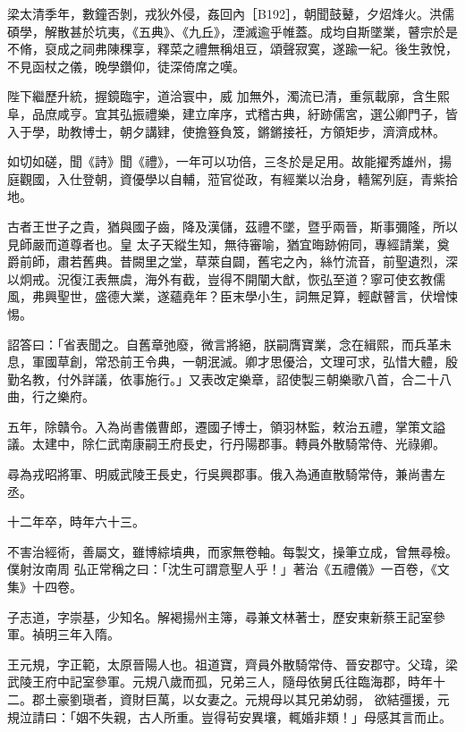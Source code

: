 \begin{pinyinscope}
 梁太清季年，數鐘否剝，戎狄外侵，姦回內［B192］，朝聞鼓鼙，夕炤烽火。洪儒碩學，解散甚於坑夷，《五典》、《九丘》，湮滅逾乎帷蓋。成均自斯墜業，瞽宗於是不脩，裒成之祠弗陳稞享，釋菜之禮無稱俎豆，頌聲寂寞，遂踰一紀。後生敦悅，不見函杖之儀，晚學鑽仰，徒深倚席之嘆。



 陛下繼歷升統，握鏡臨宇，道洽寰中，威
 加無外，濁流已清，重氛載廓，含生熙阜，品庶咸亨。宜其弘振禮樂，建立庠序，式稽古典，紆跡儒宮，選公卿門子，皆入于學，助教博士，朝夕講肄，使擔簦負笈，鏘鏘接衽，方領矩步，濟濟成林。



 如切如磋，聞《詩》聞《禮》，一年可以功倍，三冬於是足用。故能擢秀雄州，揚庭觀國，入仕登朝，資優學以自輔，蒞官從政，有經業以治身，轖駕列庭，青紫拾地。



 古者王世子之貴，猶與國子齒，降及漢儲，茲禮不墜，暨乎兩晉，斯事彌隆，所以見師嚴而道尊者也。皇
 太子天縱生知，無待審喻，猶宜晦跡俯同，專經請業，奠爵前師，肅若舊典。昔闕里之堂，草萊自闢，舊宅之內，絲竹流音，前聖遺烈，深以炯戒。況復江表無虞，海外有截，豈得不開闡大猷，恢弘至道？寧可使玄教儒風，弗興聖世，盛德大業，遂蘊堯年？臣末學小生，詞無足算，輕獻瞽言，伏增悚惕。



 詔答曰：「省表聞之。自舊章弛廢，微言將絕，朕嗣膺寶業，念在緝熙，而兵革未息，軍國草創，常恐前王令典，一朝泯滅。卿才思優洽，文理可求，弘惜大體，殷
 勤名教，付外詳議，依事施行。」又表改定樂章，詔使製三朝樂歌八首，合二十八曲，行之樂府。



 五年，除贛令。入為尚書儀曹郎，遷國子博士，領羽林監，敕治五禮，掌策文謚議。太建中，除仁武南康嗣王府長史，行丹陽郡事。轉員外散騎常侍、光祿卿。



 尋為戎昭將軍、明威武陵王長史，行吳興郡事。俄入為通直散騎常侍，兼尚書左丞。



 十二年卒，時年六十三。



 不害治經術，善屬文，雖博綜墳典，而家無卷軸。每製文，操筆立成，曾無尋檢。僕射汝南周
 弘正常稱之曰：「沈生可謂意聖人乎！」著治《五禮儀》一百卷，《文集》十四卷。



 子志道，字崇基，少知名。解褐揚州主簿，尋兼文林著士，歷安東新蔡王記室參軍。禎明三年入隋。



 王元規，字正範，太原晉陽人也。祖道寶，齊員外散騎常侍、晉安郡守。父瑋，梁武陵王府中記室參軍。元規八歲而孤，兄弟三人，隨母依舅氏往臨海郡，時年十二。郡土豪劉瑱者，資財巨萬，以女妻之。元規母以其兄弟幼弱，
 欲結彊援，元規泣請曰：「姻不失親，古人所重。豈得茍安異壤，輒婚非類！」母感其言而止。




\end{pinyinscope}
